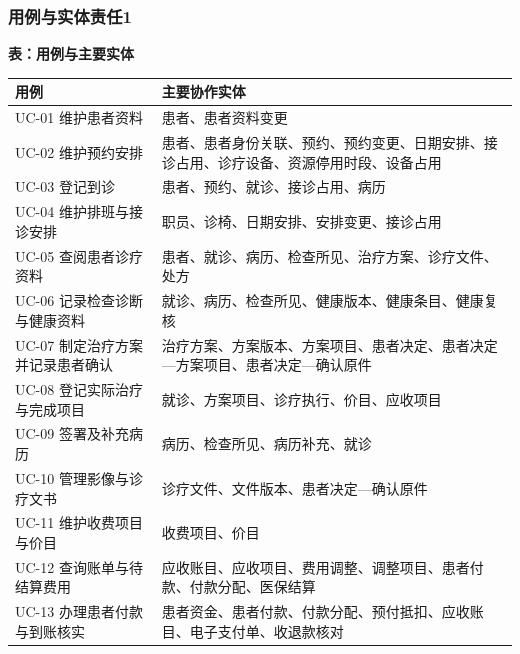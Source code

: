 \documentclass[UTF8,a4paper,zihao=-4,fontset=none]{ctexart}
\begin{document}
\subsubsection{用例与实体责任1}
{\small\setlength{\tabcolsep}{3pt}\renewcommand{\arraystretch}{1.13}
\noindent\textbf{表\thetable：用例与主要实体}\par\smallskip
\noindent\begin{tabular}{@{}>{\raggedright\arraybackslash}p{5.887cm}>{\raggedright\arraybackslash}p{9.812cm}@{}}
\toprule
用例 & 主要协作实体 \\ \midrule
UC-01 维护患者资料 & 患者、患者资料变更 \\
UC-02 维护预约安排 & 患者、患者身份关联、预约、预约变更、日期安排、接诊占用、诊疗设备、资源停用时段、设备占用 \\
UC-03 登记到诊 & 患者、预约、就诊、接诊占用、病历 \\
UC-04 维护排班与接诊安排 & 职员、诊椅、日期安排、安排变更、接诊占用 \\
UC-05 查阅患者诊疗资料 & 患者、就诊、病历、检查所见、治疗方案、诊疗文件、处方 \\
UC-06 记录检查诊断与健康资料 & 就诊、病历、检查所见、健康版本、健康条目、健康复核 \\
UC-07 制定治疗方案并记录患者确认 & 治疗方案、方案版本、方案项目、患者决定、患者决定—方案项目、患者决定—确认原件 \\
UC-08 登记实际治疗与完成项目 & 就诊、方案项目、诊疗执行、价目、应收项目 \\
UC-09 签署及补充病历 & 病历、检查所见、病历补充、就诊 \\
UC-10 管理影像与诊疗文书 & 诊疗文件、文件版本、患者决定—确认原件 \\
UC-11 维护收费项目与价目 & 收费项目、价目 \\
UC-12 查询账单与待结算费用 & 应收账目、应收项目、费用调整、调整项目、患者付款、付款分配、医保结算 \\
UC-13 办理患者付款与到账核实 & 患者资金、患者付款、付款分配、预付抵扣、应收账目、电子支付单、收退款核对 \\
\bottomrule
\end{tabular}\par}
\medskip

\clearpage
\end{document}
